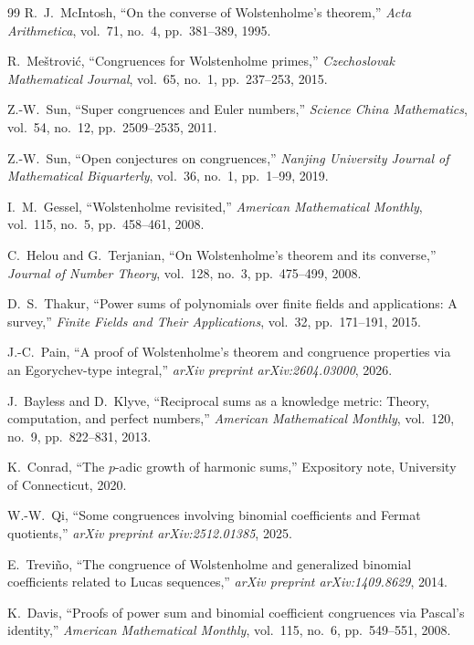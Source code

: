 \documentclass[11pt]{article}
\theoremstyle{definition}
\theoremstyle{remark}
\begin{document}
\begin{thebibliography}{99}
R.~J.~McIntosh, ``On the converse of Wolstenholme's theorem,'' \emph{Acta Arithmetica}, vol.~71, no.~4, pp.~381--389, 1995.

R.~Me\v{s}trovi\'c, ``Congruences for Wolstenholme primes,'' \emph{Czechoslovak Mathematical Journal}, vol.~65, no.~1, pp.~237--253, 2015.

Z.-W.~Sun, ``Super congruences and Euler numbers,'' \emph{Science China Mathematics}, vol.~54, no.~12, pp.~2509--2535, 2011.

Z.-W.~Sun, ``Open conjectures on congruences,'' \emph{Nanjing University Journal of Mathematical Biquarterly}, vol.~36, no.~1, pp.~1--99, 2019.

I.~M.~Gessel, ``Wolstenholme revisited,'' \emph{American Mathematical Monthly}, vol.~115, no.~5, pp.~458--461, 2008.

C.~Helou and G.~Terjanian, ``On Wolstenholme's theorem and its converse,'' \emph{Journal of Number Theory}, vol.~128, no.~3, pp.~475--499, 2008.

D.~S.~Thakur, ``Power sums of polynomials over finite fields and applications: A survey,'' \emph{Finite Fields and Their Applications}, vol.~32, pp.~171--191, 2015.

J.-C.~Pain, ``A proof of Wolstenholme's theorem and congruence properties via an Egorychev-type integral,'' \emph{arXiv preprint arXiv:2604.03000}, 2026.

J.~Bayless and D.~Klyve, ``Reciprocal sums as a knowledge metric: Theory, computation, and perfect numbers,'' \emph{American Mathematical Monthly}, vol.~120, no.~9, pp.~822--831, 2013.

K.~Conrad, ``The $p$-adic growth of harmonic sums,'' Expository note, University of Connecticut, 2020.

W.-W.~Qi, ``Some congruences involving binomial coefficients and Fermat quotients,'' \emph{arXiv preprint arXiv:2512.01385}, 2025.

E.~Trevi\~no, ``The congruence of Wolstenholme and generalized binomial coefficients related to Lucas sequences,'' \emph{arXiv preprint arXiv:1409.8629}, 2014.

K.~Davis, ``Proofs of power sum and binomial coefficient congruences via Pascal's identity,'' \emph{American Mathematical Monthly}, vol.~115, no.~6, pp.~549--551, 2008.


\end{thebibliography}
\end{document}
